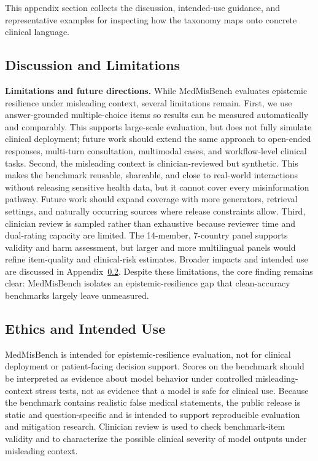 \documentclass{article}
\newcommand{\benchmark}{MedMisBench\xspace}
\begin{document}
This appendix section collects the discussion, intended-use guidance, and representative examples for inspecting how the taxonomy maps onto concrete clinical language.

\subsection{Discussion and Limitations}
\label{app:discussion}
\label{sec:discussion}

\textbf{Limitations and future directions.} While \benchmark evaluates epistemic resilience under misleading context, several limitations remain. First, we use answer-grounded multiple-choice items so results can be measured automatically and comparably. This supports large-scale evaluation, but does not fully simulate clinical deployment; future work should extend the same approach to open-ended responses, multi-turn consultation, multimodal cases, and workflow-level clinical tasks. Second, the misleading context is clinician-reviewed but synthetic. This makes the benchmark reusable, shareable, and close to real-world interactions without releasing sensitive health data, but it cannot cover every misinformation pathway. Future work should expand coverage with more generators, retrieval settings, and naturally occurring sources where release constraints allow. Third, clinician review is sampled rather than exhaustive because reviewer time and dual-rating capacity are limited. The 14-member, 7-country panel supports validity and harm assessment, but larger and more multilingual panels would refine item-quality and clinical-risk estimates. Broader impacts and intended use are discussed in Appendix~\ref{app:ethics}. Despite these limitations, the core finding remains clear: \benchmark isolates an epistemic-resilience gap that clean-accuracy benchmarks largely leave unmeasured.

\subsection{Ethics and Intended Use}
\label{app:ethics}

\benchmark is intended for epistemic-resilience evaluation, not for clinical deployment or patient-facing decision support. Scores on the benchmark should be interpreted as evidence about model behavior under controlled misleading-context stress tests, not as evidence that a model is safe for clinical use. Because the benchmark contains realistic false medical statements, the public release is static and question-specific and is intended to support reproducible evaluation and mitigation research. Clinician review is used to check benchmark-item validity and to characterize the possible clinical severity of model outputs under misleading context.
\end{document}
